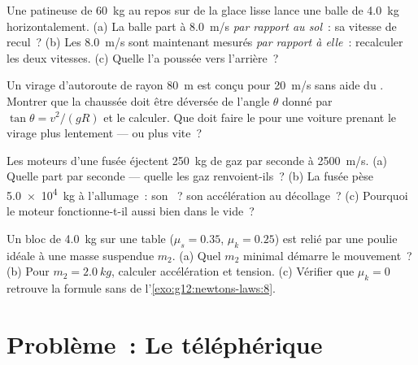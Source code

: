 \begin{exercise}[$\star\star\star$]\label{exo:g12:newtons-laws:12}
Une patineuse de \qty{60}{kg} au repos sur de la glace lisse lance une
balle de \qty{4.0}{kg} horizontalement. (a) La balle part à
\qty{8.0}{m/s} \emph{par rapport au sol}~: sa vitesse de recul~?
(b) Les \qty{8.0}{m/s} sont maintenant mesurés \emph{par rapport à
elle}~: recalculer les deux vitesses. (c) Quelle
 l'a poussée vers l'arrière~?
\end{exercise}

\begin{exercise}[$\star\star\star$]\label{exo:g12:newtons-laws:13}
Un virage d'autoroute de rayon \qty{80}{m} est conçu pour \qty{20}{m/s}
sans aide du . Montrer que la chaussée doit être
déversée de l'angle $\theta$ donné par $\tan\theta = v^2/(gR)$ et le
calculer. Que doit faire le  pour une voiture
prenant le virage plus lentement --- ou plus vite~?
\end{exercise}

\begin{exercise}[$\star\star\star$]\label{exo:g12:newtons-laws:14}
Les moteurs d'une fusée éjectent \qty{250}{kg} de gaz par seconde à
\qty{2500}{m/s}. (a) Quelle  part par
seconde --- quelle  les gaz renvoient-ils~?
(b) La fusée pèse \qty{5.0e4}{kg} à l'allumage~: son
~? son accélération au décollage~? (c) Pourquoi
le moteur fonctionne-t-il aussi bien dans le vide~?
\end{exercise}

\begin{exercise}[$\star\star\star$]\label{exo:g12:newtons-laws:15}
Un bloc de \qty{4.0}{kg} sur une table ($\mu_s = 0.35$, $\mu_k = 0.25$)
est relié par une poulie idéale à une masse suspendue $m_2$. (a) Quel
$m_2$ minimal démarre le mouvement~? (b) Pour $m_2 = \qty{2.0}{kg}$,
calculer accélération et tension. (c) Vérifier que
$\mu_k = 0$ retrouve la formule sans  de
l'\cref{exo:g12:newtons-laws:8}.
\end{exercise}

\section{Problème~: Le téléphérique}

